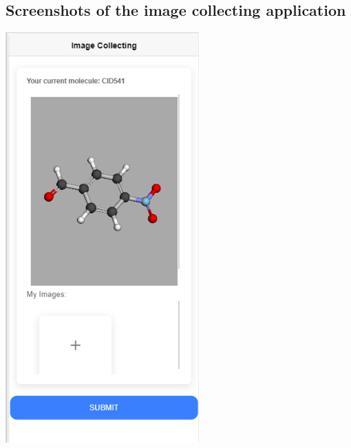 \documentclass[12pt]{article}
\begin{document}
\subsection*{Screenshots of the image collecting application}

\begin{center}
    \includegraphics[width=0.3\linewidth]{ss2.png}
\end{center}
\end{document}
